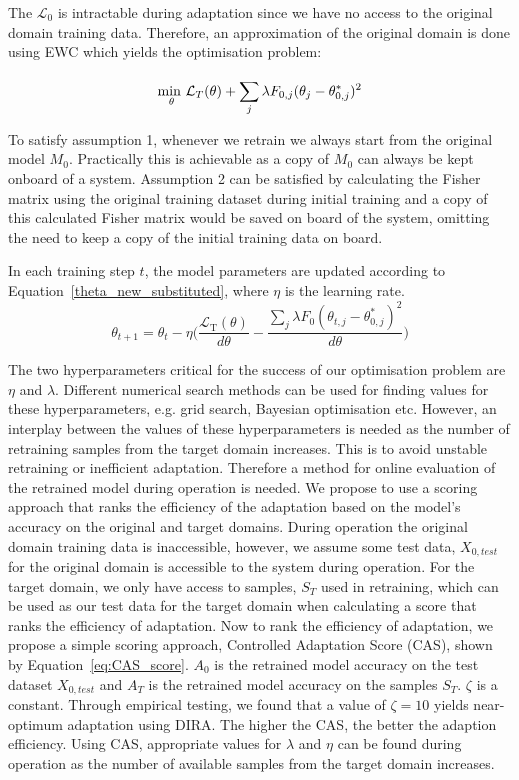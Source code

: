 The $\mathcal{L}_0$ is intractable during adaptation since we have no access to the original domain training data. 
%
Therefore, an approximation of the original domain is done using EWC which yields the optimisation problem:

\begin{equation}
    \displaystyle{\operatorname*{min\text{ }}_{\theta}} \mathcal{L}_T(\theta) 
+ \sum_{j}^{}\lambda F_{0,j}(\theta_j - \theta^{*}_{0,j})^2
\end{equation}

To satisfy assumption 1, whenever we retrain we always start from the original model $M_0$. 
%
Practically this is achievable as a copy of $M_0$ can always be kept onboard of a system. Assumption 2 can be satisfied by calculating the Fisher matrix using the original training dataset during initial training and a copy of this calculated Fisher matrix would be saved on board of the system, omitting the need to keep a copy of the initial training data on board.

In each training step $t$, the model parameters are updated according to Equation~\ref{theta_new_substituted}, where $\eta$ is the learning rate. 
%
\begin{equation}
   \theta_{t+1} = \theta_{t} - \eta \bigg( \dfrac{\mathcal{L}_{\text{T}}(\theta)}{d\theta} - 
   \dfrac{\sum_{j}^{}\lambda F_0(\theta_{t,j} - \theta^{*}_{0,j})^2}{d\theta} \bigg)
   \label{theta_new_substituted}
\end{equation}

The two hyperparameters critical for the success of our optimisation problem are $\eta$ and $\lambda$. 
%
Different numerical search methods can be used for finding values for these hyperparameters, e.g. grid search, Bayesian optimisation etc.
%
However, an interplay between the values of these hyperparameters is needed as the number of retraining samples from the target domain increases. This is to avoid unstable retraining or inefficient adaptation.
%
Therefore a method for online evaluation of the retrained model during operation is needed.
%
We propose to use a scoring approach that ranks the efficiency of the adaptation based on the model's accuracy on the original and target domains.
%
During operation the original domain training data is inaccessible, however, we assume some test data, $X_{0, test}$ for the original domain is accessible to the system during operation. 
%
For the target domain, we only have access to samples, $S_{T}$ used in retraining, which can be used as our test data for the target domain when calculating a score that ranks the efficiency of adaptation.  
%
Now to rank the efficiency of adaptation, we propose a simple scoring approach, Controlled Adaptation Score (CAS), shown by Equation~\ref{eq:CAS_score}. 
%
$A_0$ is the retrained model accuracy on the test dataset $X_{0,test}$ and $A_T$ is the retrained model accuracy on the samples $S_{T}$. 
%
$\zeta$ is a constant. Through empirical testing, we found that a value of $\zeta=10$ yields near-optimum adaptation using DIRA.
%
The higher the CAS, the better the adaption efficiency. Using CAS, appropriate values for $\lambda$ and $\eta$ can be found during operation as the number of available samples from the target domain increases.

